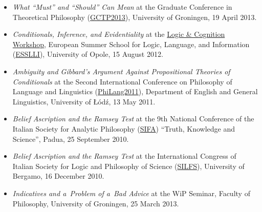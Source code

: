 \documentclass[a4paper,12pt]{article}
\begin{document}
\begin{small}
  \begin{itemize}
  \item \emph{What ``Must'' and ``Should'' Can Mean} at the Graduate
    Conference in Theoretical Philosophy (\href{http://www.philos.rug.nl/GCTP2013/}{GCTP2013}), University of Groningen, 19
    April 2013. %
    
  \item \emph{Conditionals, Inference, and Evidentiality} at the \href{http://www.ai.rug.nl/SocialCognition/logic-cognition/}{Logic
    \& Cognition Workshop}, European Summer School for Logic, Language,
    and Information (\href{http://www.esslli2012.pl}{ESSLLI}), University of Opole, 15 August
    2012. %

  \item \emph{Ambiguity and Gibbard's Argument Against Propositional
      Theories of Conditionals} at the Second International Conference
    on Philosophy of Language and Linguistics (\href{http://ia.uni.lodz.pl/linguistics/events/philang-2011}{PhiLang2011}),
    Department of English and General Linguistics, University of Łódź,
    13 May
    2011. %

  \item \emph{Belief Ascription and the Ramsey Test} at the 9th
    National Conference of the Italian Society for Analytic Philosophy
    (\href{http://www.filosofia.lettere.unipd.it/analitica/sifa2010/}{SIFA}) ``Truth, Knowledge and Science'', Padua, 25 September 2010. %

    
  \item \emph{Belief Ascription and the Ramsey Test} at the
    International Congress of Italian Society for Logic and Philosophy
    of Science (\href{http://dinamico2.unibg.it/silfs/convegno2010.htm}{SILFS}), University of Bergamo, 16 December  2010. %
  \end{itemize}
  

  \begin{itemize}
  \item \emph{Indicatives and a~Problem of a~Bad Advice} at the WiP Seminar,
    Faculty of Philosophy, University of Groningen, 25 March 2013.
    

\end{itemize}
\end{small}
\end{document}
